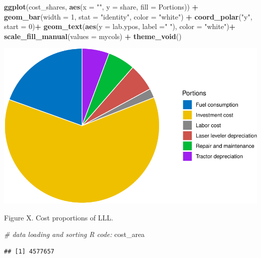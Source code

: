 \documentclass[
]{article}
\newenvironment{Shaded}{\begin{snugshade}}{\end{snugshade}}
\newcommand{\AttributeTok}[1]{\textcolor[rgb]{0.13,0.29,0.53}{#1}}
\newcommand{\CommentTok}[1]{\textcolor[rgb]{0.56,0.35,0.01}{\textit{#1}}}
\newcommand{\DecValTok}[1]{\textcolor[rgb]{0.00,0.00,0.81}{#1}}
\newcommand{\FunctionTok}[1]{\textcolor[rgb]{0.13,0.29,0.53}{\textbf{#1}}}
\newcommand{\NormalTok}[1]{#1}
\newcommand{\SpecialCharTok}[1]{\textcolor[rgb]{0.81,0.36,0.00}{\textbf{#1}}}
\newcommand{\StringTok}[1]{\textcolor[rgb]{0.31,0.60,0.02}{#1}}
\begin{document}
\begin{Shaded}
\begin{Highlighting}[]
\FunctionTok{ggplot}\NormalTok{(cost\_shares, }\FunctionTok{aes}\NormalTok{(}\AttributeTok{x =} \StringTok{""}\NormalTok{, }\AttributeTok{y =}\NormalTok{ share, }\AttributeTok{fill =}\NormalTok{ Portions)) }\SpecialCharTok{+}
  \FunctionTok{geom\_bar}\NormalTok{(}\AttributeTok{width =} \DecValTok{1}\NormalTok{, }\AttributeTok{stat =} \StringTok{"identity"}\NormalTok{, }\AttributeTok{color =} \StringTok{"white"}\NormalTok{) }\SpecialCharTok{+}
  \FunctionTok{coord\_polar}\NormalTok{(}\StringTok{"y"}\NormalTok{, }\AttributeTok{start =} \DecValTok{0}\NormalTok{)}\SpecialCharTok{+}
  \FunctionTok{geom\_text}\NormalTok{(}\FunctionTok{aes}\NormalTok{(}\AttributeTok{y =}\NormalTok{ lab.ypos, }\AttributeTok{label =}\StringTok{" "}\NormalTok{), }\AttributeTok{color =} \StringTok{"white"}\NormalTok{)}\SpecialCharTok{+}
  \FunctionTok{scale\_fill\_manual}\NormalTok{(}\AttributeTok{values =}\NormalTok{ mycols) }\SpecialCharTok{+}
  \FunctionTok{theme\_void}\NormalTok{()}
\end{Highlighting}
\end{Shaded}

\includegraphics{Laser_leveling_simulation_files/figure-latex/cost-benefit-analysis-1.pdf}

Figure X. Cost proportions of LLL.

\begin{Shaded}
\begin{Highlighting}[]
\CommentTok{\# data loading and sorting R code:}
\NormalTok{cost\_area}
\end{Highlighting}
\end{Shaded}

\begin{verbatim}
## [1] 4577657
\end{verbatim}
\end{document}

